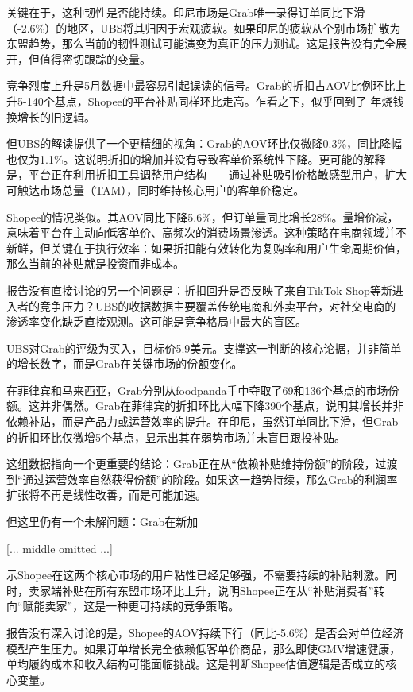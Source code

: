 \documentclass[11pt]{ctexart}
\begin{document}
关键在于，这种韧性是否能持续。印尼市场是Grab唯一录得订单同比下滑（-2.6\%）的地区，UBS将其归因于宏观疲软。如果印尼的疲软从个别市场扩散为东盟趋势，那么当前的韧性测试可能演变为真正的压力测试。这是报告没有完全展开，但值得密切跟踪的变量。

竞争烈度上升是5月数据中最容易引起误读的信号。Grab的折扣占AOV比例环比上升5-140个基点，Shopee的平台补贴同样环比走高。乍看之下，似乎回到了 年烧钱换增长的旧逻辑。

但UBS的解读提供了一个更精细的视角：Grab的AOV环比仅微降0.3\%，同比降幅也仅为1.1\%。这说明折扣的增加并没有导致客单价系统性下降。更可能的解释是，平台正在利用折扣工具调整用户结构——通过补贴吸引价格敏感型用户，扩大可触达市场总量（TAM），同时维持核心用户的客单价稳定。

Shopee的情况类似。其AOV同比下降5.6\%，但订单量同比增长28\%。量增价减，意味着平台在主动向低客单价、高频次的消费场景渗透。这种策略在电商领域并不新鲜，但关键在于执行效率：如果折扣能有效转化为复购率和用户生命周期价值，那么当前的补贴就是投资而非成本。

报告没有直接讨论的另一个问题是：折扣回升是否反映了来自TikTok Shop等新进入者的竞争压力？UBS的收据数据主要覆盖传统电商和外卖平台，对社交电商的渗透率变化缺乏直接观测。这可能是竞争格局中最大的盲区。

UBS对Grab的评级为买入，目标价5.9美元。支撑这一判断的核心论据，并非简单的增长数字，而是Grab在关键市场的份额变化。

在菲律宾和马来西亚，Grab分别从foodpanda手中夺取了69和136个基点的市场份额。这并非偶然。Grab在菲律宾的折扣环比大幅下降390个基点，说明其增长并非依赖补贴，而是产品力或运营效率的提升。在印尼，虽然订单同比下滑，但Grab的折扣环比仅微增5个基点，显示出其在弱势市场并未盲目跟投补贴。

这组数据指向一个更重要的结论：Grab正在从“依赖补贴维持份额”的阶段，过渡到“通过运营效率自然获得份额”的阶段。如果这一趋势持续，那么Grab的利润率扩张将不再是线性改善，而是可能加速。

但这里仍有一个未解问题：Grab在新加

[... middle omitted ...]

示Shopee在这两个核心市场的用户粘性已经足够强，不需要持续的补贴刺激。同时，卖家端补贴在所有东盟市场环比上升，说明Shopee正在从“补贴消费者”转向“赋能卖家”，这是一种更可持续的竞争策略。

报告没有深入讨论的是，Shopee的AOV持续下行（同比-5.6\%）是否会对单位经济模型产生压力。如果订单增长完全依赖低客单价商品，那么即使GMV增速健康，单均履约成本和收入结构可能面临挑战。这是判断Shopee估值逻辑是否成立的核心变量。
\end{document}

